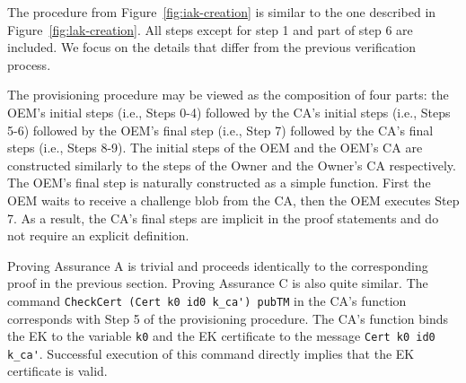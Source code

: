 \documentclass[runningheads]{llncs}
\begin{document}



The procedure from Figure~\ref{fig:iak-creation} is similar to the one
described in Figure~\ref{fig:lak-creation}. All steps except for step 1 and
part of step 6 are included. We focus on the details that differ from
the previous verification process.

The provisioning procedure may be viewed as the composition of four
parts: the OEM's initial steps (i.e., Steps 0-4) followed by the CA's
initial steps (i.e., Steps 5-6) followed by the OEM's final step
(i.e., Step 7) followed by the CA's final steps (i.e., Steps 8-9). The
initial steps of the OEM and the OEM's CA are constructed similarly to
the steps of the Owner and the Owner's CA respectively.  The OEM's
final step is naturally constructed as a simple function. First the
OEM waits to receive a challenge blob from the CA, then the OEM
executes Step 7. As a result, the CA's final steps are implicit in the
proof statements and do not require an explicit definition.

Proving Assurance A is trivial and proceeds identically to the
corresponding proof in the previous section. Proving Assurance C is
also quite similar. The command
\verb|CheckCert (Cert k0 id0 k_ca') pubTM| in the CA's function
corresponds with Step 5 of the provisioning procedure. The CA's
function binds the EK to the variable \verb|k0| and the EK certificate
to the message \verb|Cert k0 id0 k_ca'|.  Successful execution of this
command directly implies that the EK certificate is valid.
\end{document}
